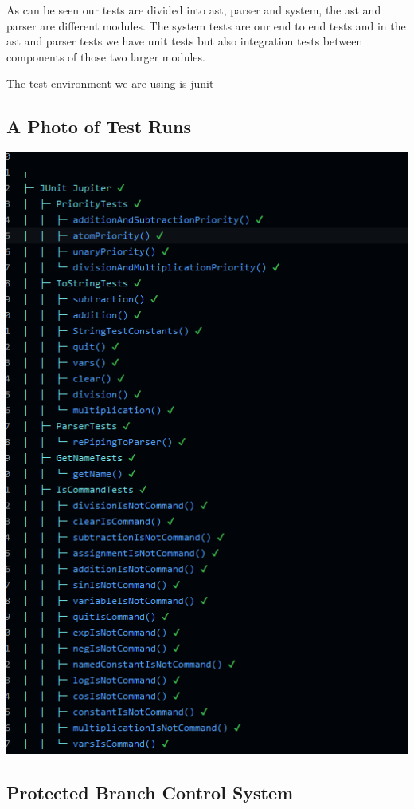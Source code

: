 \documentclass{article}
\begin{document}
As can be seen our tests are divided into ast, parser and system, the ast and parser are different modules.
The system tests are our end to end tests and in the ast and parser tests we have unit tests but also integration tests between components of those two larger modules.

The test environment we are using is junit

\subsection{A Photo of Test Runs}
\includegraphics[width=\linewidth]{Screenshot 2023-11-29 161454.png}

\subsection{Protected Branch Control System}
\end{document}
